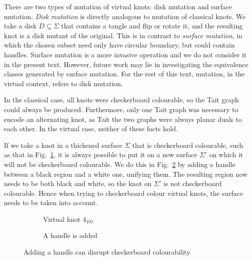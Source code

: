 \documentclass[12pt]{report}
\begin{document}
There are two types of mutation of virtual knots: disk mutation and surface mutation. \textit{Disk mutation} is directly analogous to mutation of classical knots. We take a disk $D \subseteq \Sigma$ that contains a tangle and flip or rotate it, and the resulting knot is a disk mutant of the original. This is in contrast to \textit{surface mutation}, in which the chosen subset need only have circular boundary, but could contain handles. Surface mutation is a more invasive operation and we do not consider it in the present text. However, future work may lie in investigating the equivalence classes generated by surface mutation. For the rest of this text, mutation, in the virtual context, refers to disk mutation.

In the classical case, all knots were checkerboard colourable, so the Tait graph could always be produced. Furthermore, only one Tait graph was necessary to encode an alternating knot, as Tait the two graphs were always planar duals to each other. In the virtual case, neither of these facts hold.

If we take a knot in a thickened surface $\Sigma$ that is checkerboard colourable, such as that in Fig.~\ref{fig:4-105-vknot}, it is always possible to put it on a new surface $\Sigma'$ on which it will not be checkerboard colourable. We do this in Fig.~\ref{fig:4-105-vknot-with-handle} by adding a handle between a black region and a white one, unifying them. The resulting region now needs to be both black and white, so the knot on $\Sigma'$ is not checkerboard colourable. Hence when trying to checkerboard colour virtual knots, the surface needs to be taken into account.

\begin{figure}[hbt]
	\centering
	\hspace*{\fill}
	\begin{subfigure}[b]{0.4 \textwidth}
		\centering
		\def\svgscale{0.35}
		
		\caption{Virtual knot $4_{105}$}
		\label{fig:4-105-vknot}
	\end{subfigure}
	\hspace*{\fill}	\hspace*{\fill}	\hspace*{\fill}
	\begin{subfigure}[b]{0.4 \textwidth}
		\centering
		\def\svgscale{0.35}
		
		\caption{A handle is added}
		\label{fig:4-105-vknot-with-handle}
	\end{subfigure}
	\hspace*{\fill} 
	\caption{Adding a handle can disrupt checkerboard colourability.}
	\label{fig:adding-handle-to-4-105}
\end{figure}
\end{document}
